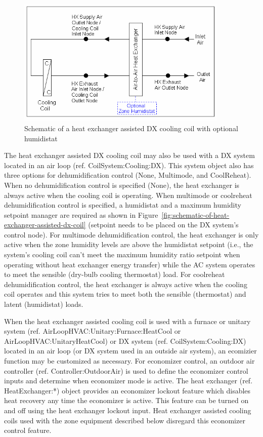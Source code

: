 \begin{figure}[hbtp] %
\centering
\includegraphics[width=0.9\textwidth, height=0.9\textheight, keepaspectratio=true]{media/image4094.png}
\caption{Schematic of a heat exchanger assisted DX cooling coil with optional humidistat \protect \label{fig:schematic-of-a-heat-exchanger-assisted-dx}}
\end{figure}

The heat exchanger assisted DX cooling coil may also be used with a DX system located in an air loop (ref. CoilSystem:Cooling:DX). This system object also has three options for dehumidification control (None, Multimode, and CoolReheat). When no dehumidification control is specified (None), the heat exchanger is always active when the cooling coil is operating. When multimode or coolreheat dehumidification control is specified, a humidistat and a maximum humidity setpoint manager are required as shown in Figure~\ref{fig:schematic-of-heat-exchanger-assisted-dx-coil} (setpoint needs to be placed on the DX system's control node). For multimode dehumidification control, the heat exchanger is only active when the zone humidity levels are above the humidistat setpoint (i.e., the system's cooling coil can't meet the maximum humidity ratio setpoint when operating without heat exchanger energy transfer) while the AC system operates to meet the sensible (dry-bulb cooling thermostat) load. For coolreheat dehumidification control, the heat exchanger is always active when the cooling coil operates and this system tries to meet both the sensible (thermostat) and latent (humidistat) loads.

When the heat exchanger assisted cooling coil is used with a furnace or unitary system (ref. AirLoopHVAC:Unitary:Furnace:HeatCool or AirLoopHVAC:UnitaryHeatCool) or DX system (ref. CoilSystem:Cooling:DX) located in an air loop (or DX system used in an outside air system), an ecomizier function may be customized as necessary. For economizer control, an outdoor air controller (ref. Controller:OutdoorAir) is used to define the economizer control inputs and determine when economizer mode is active. The heat exchanger (ref. HeatExchanger:*) object provides an economizer lockout feature which disables heat recovery any time the economizer is active. This feature can be turned on and off using the heat exchanger lockout input. Heat exchanger assisted cooling coils used with the zone equipment described below disregard this economizer control feature.

